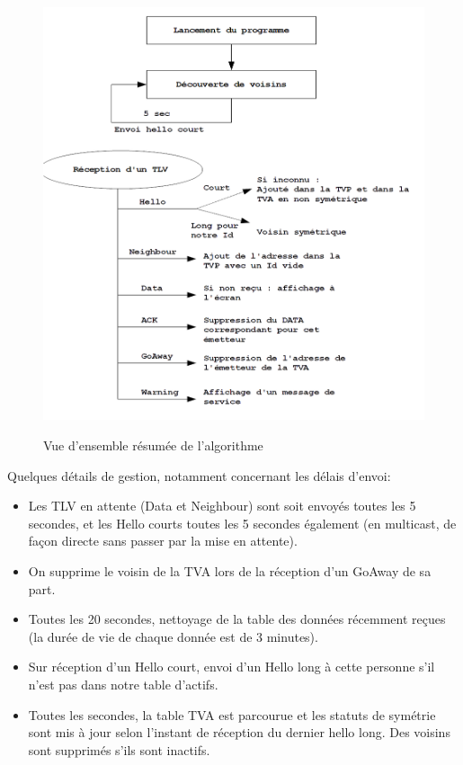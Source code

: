 \documentclass[11pt,a4paper]{article}
\begin{document}
	\begin{figure}[ht!]
		\centering
			\includegraphics[width=.8\columnwidth]{img.png}
		\label{fig:img}
		\caption{Vue d'ensemble résumée de l'algorithme}
	\end{figure}
	
	Quelques détails de gestion, notamment concernant les délais d'envoi:
	
	\begin{itemize}
		\item 	Les TLV en attente (Data et Neighbour) sont soit envoyés toutes les 5 secondes, et les Hello courts toutes les 5 secondes également (en multicast, de façon 	directe sans passer par la mise en attente).
	
	\item On supprime le voisin de la TVA lors de la réception d'un GoAway de sa part.
	
	\item Toutes les 20 secondes, nettoyage de la table des données récemment reçues (la durée de vie de chaque donnée est de 3 minutes).
	
	\item Sur réception d'un Hello court, envoi d'un Hello long à cette personne s'il n'est pas dans notre table d'actifs.
	
	\item  Toutes les secondes, la table TVA est parcourue et les statuts de symétrie sont mis à jour selon l'instant de réception du dernier hello long.
	Des voisins sont supprimés s'ils sont inactifs.

	\end{itemize}
	
\end{document}
